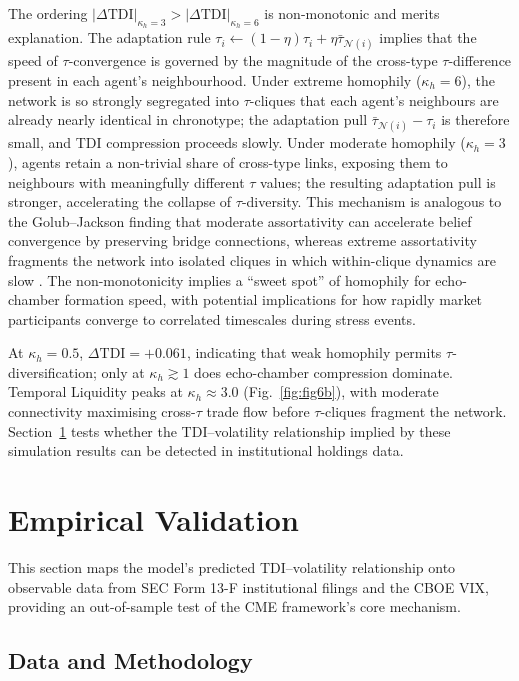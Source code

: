 \documentclass[10pt,twocolumn]{article}
\begin{document}
The ordering $|\Delta\mathrm{TDI}|_{\kappa_h=3} > |\Delta\mathrm{TDI}|_{\kappa_h=6}$
is non-monotonic and merits explanation.
The adaptation rule $\tau_i \leftarrow (1-\eta)\tau_i + \eta\bar\tau_{\mathcal{N}(i)}$
implies that the speed of $\tau$-convergence is governed by the magnitude of
the cross-type $\tau$-difference present in each agent's neighbourhood.
Under extreme homophily ($\kappa_h = 6$), the network is so strongly
segregated into $\tau$-cliques that each agent's neighbours are already
nearly identical in chronotype; the adaptation pull
$\bar\tau_{\mathcal{N}(i)} - \tau_i$ is therefore small, and TDI compression
proceeds slowly.
Under moderate homophily ($\kappa_h = 3$), agents retain a non-trivial
share of cross-type links, exposing them to neighbours with meaningfully
different $\tau$ values; the resulting adaptation pull is stronger,
accelerating the collapse of $\tau$-diversity.
This mechanism is analogous to the Golub--Jackson finding that moderate
assortativity can accelerate belief convergence by preserving bridge
connections, whereas extreme assortativity fragments the network into
isolated cliques in which within-clique dynamics are slow \cite{golub2010}.
The non-monotonicity implies a ``sweet spot'' of homophily for echo-chamber
formation speed, with potential implications for how rapidly market
participants converge to correlated timescales during stress events.

At $\kappa_h = 0.5$, $\Delta\mathrm{TDI} = +0.061$, indicating that weak homophily permits $\tau$-diversification; only at $\kappa_h \gtrsim 1$ does echo-chamber compression dominate.
Temporal Liquidity peaks at $\kappa_h \approx 3.0$ (Fig.~\ref{fig:fig6b}), with moderate connectivity maximising cross-$\tau$ trade flow before $\tau$-cliques fragment the network.
Section~\ref{sec:empirical} tests whether the TDI--volatility relationship
implied by these simulation results can be detected in institutional
holdings data.

\section{Empirical Validation}
\label{sec:empirical}

This section maps the model's predicted TDI--volatility relationship onto
observable data from SEC Form 13-F institutional filings and the CBOE VIX,
providing an out-of-sample test of the CME framework's core mechanism.

\subsection{Data and Methodology}
\end{document}

